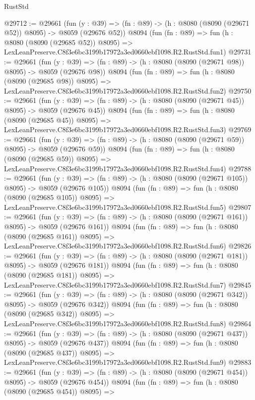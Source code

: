 \begin{lexlean}{RustStd}
\begin{coremodule}
@29712 := @29661
    (fun (y : @39) => (fn : @89) -> (h : @8080 (@8090 (@29671 @52)) @8095) -> @8059 (@29676 @52))
    @8094
    (fun (fn : @89) =>
    fun (h : @8080 (@8090 (@29685 @52)) @8095) =>
    LexLeanPreserve.C8f3e6bc3199b17972a3ed0660ebf1098.R2.RustStd.fun1)
@29731 := @29661
    (fun (y : @39) => (fn : @89) -> (h : @8080 (@8090 (@29671 @98)) @8095) -> @8059 (@29676 @98))
    @8094
    (fun (fn : @89) =>
    fun (h : @8080 (@8090 (@29685 @98)) @8095) =>
    LexLeanPreserve.C8f3e6bc3199b17972a3ed0660ebf1098.R2.RustStd.fun2)
@29750 := @29661
    (fun (y : @39) => (fn : @89) -> (h : @8080 (@8090 (@29671 @45)) @8095) -> @8059 (@29676 @45))
    @8094
    (fun (fn : @89) =>
    fun (h : @8080 (@8090 (@29685 @45)) @8095) =>
    LexLeanPreserve.C8f3e6bc3199b17972a3ed0660ebf1098.R2.RustStd.fun3)
@29769 := @29661
    (fun (y : @39) => (fn : @89) -> (h : @8080 (@8090 (@29671 @59)) @8095) -> @8059 (@29676 @59))
    @8094
    (fun (fn : @89) =>
    fun (h : @8080 (@8090 (@29685 @59)) @8095) =>
    LexLeanPreserve.C8f3e6bc3199b17972a3ed0660ebf1098.R2.RustStd.fun4)
@29788 := @29661
    (fun (y : @39) => (fn : @89) -> (h : @8080 (@8090 (@29671 @105)) @8095) -> @8059 (@29676 @105))
    @8094
    (fun (fn : @89) =>
    fun (h : @8080 (@8090 (@29685 @105)) @8095) =>
    LexLeanPreserve.C8f3e6bc3199b17972a3ed0660ebf1098.R2.RustStd.fun5)
@29807 := @29661
    (fun (y : @39) => (fn : @89) -> (h : @8080 (@8090 (@29671 @161)) @8095) -> @8059 (@29676 @161))
    @8094
    (fun (fn : @89) =>
    fun (h : @8080 (@8090 (@29685 @161)) @8095) =>
    LexLeanPreserve.C8f3e6bc3199b17972a3ed0660ebf1098.R2.RustStd.fun6)
@29826 := @29661
    (fun (y : @39) => (fn : @89) -> (h : @8080 (@8090 (@29671 @181)) @8095) -> @8059 (@29676 @181))
    @8094
    (fun (fn : @89) =>
    fun (h : @8080 (@8090 (@29685 @181)) @8095) =>
    LexLeanPreserve.C8f3e6bc3199b17972a3ed0660ebf1098.R2.RustStd.fun7)
@29845 := @29661
    (fun (y : @39) => (fn : @89) -> (h : @8080 (@8090 (@29671 @342)) @8095) -> @8059 (@29676 @342))
    @8094
    (fun (fn : @89) =>
    fun (h : @8080 (@8090 (@29685 @342)) @8095) =>
    LexLeanPreserve.C8f3e6bc3199b17972a3ed0660ebf1098.R2.RustStd.fun8)
@29864 := @29661
    (fun (y : @39) => (fn : @89) -> (h : @8080 (@8090 (@29671 @437)) @8095) -> @8059 (@29676 @437))
    @8094
    (fun (fn : @89) =>
    fun (h : @8080 (@8090 (@29685 @437)) @8095) =>
    LexLeanPreserve.C8f3e6bc3199b17972a3ed0660ebf1098.R2.RustStd.fun9)
@29883 := @29661
    (fun (y : @39) => (fn : @89) -> (h : @8080 (@8090 (@29671 @454)) @8095) -> @8059 (@29676 @454))
    @8094
    (fun (fn : @89) =>
    fun (h : @8080 (@8090 (@29685 @454)) @8095) =>

\end{coremodule}
\end{lexlean}

